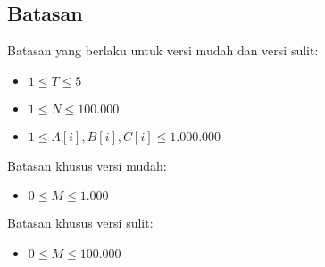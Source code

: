 \documentclass[../main_problemset.tex]{subfiles} %
\begin{document}
\subsection*{Batasan}

\begin{minipage}[t]{0.47\textwidth}

Batasan yang berlaku untuk versi mudah dan versi sulit:

\begin{itemize}
	\item $ 1 \le T \le 5 $
	\item $ 1 \le N \le 100.000 $
	\item $ 1 \le A[i], B[i], C[i] \le 1.000.000 $
\end{itemize}
\end{minipage}
\begin{minipage}[t]{0.06\textwidth}
    \hfill
\end{minipage}
\begin{minipage}[t]{0.47\textwidth}
Batasan khusus versi mudah:

\begin{itemize}
	\item $0 \le M \le 1.000$
\end{itemize}

\vspace{.2cm}

Batasan khusus versi sulit:

\begin{itemize}
	\item $0 \le M \le 100.000$
\end{itemize}
\end{minipage}
\end{document}
